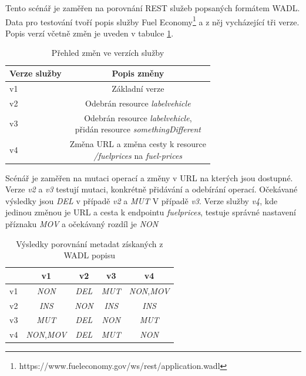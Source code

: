 \documentclass[czech,DP]{thesiskiv}
\begin{document}
Tento scénář je zaměřen na porovnání REST služeb popsaných formátem WADL. Data pro testování tvoří popis služby Fuel Economy\footnote{https://www.fueleconomy.gov/ws/rest/application.wadl} a z něj vycházející tři verze. Popis verzí včetně změn je uveden v tabulce \ref{tab:wadl-diffs}.

\begin{table}[h]
	\centering
	\begin{tabular}{|l|c|}
		\hline
		Verze služby & Popis změny \\
		\hline
		\hline
		v1 & Základní verze \\
		\hline
		v2 & Odebrán resource \textit{labelvehicle} \\
		\hline
		v3 & \makecell{Odebrán resource \textit{labelvehicle}, \\ přidán resource \textit{somethingDifferent}} \\
		\hline
		v4 & \makecell{Změna URL a změna cesty k resource \\ \textit{/fuelprices} na \textit{fuel-prices}}  \\
		\hline
	\end{tabular}
	\caption{Přehled změn ve verzích služby}
	\label{tab:wadl-diffs}
\end{table}

Scénář je zaměřen na mutaci operací a změny v URL na kterých jsou dostupné. Verze \textit{v2} a \textit{v3} testují mutaci, konkrétně přidávání a odebírání operací. Očekávané výsledky jsou \textit{DEL} v případě \textit{v2} a \textit{MUT} V případě \textit{v3}. Verze služby \textit{v4}, kde jedinou změnou je URL a cesta k endpointu \textit{fuelprices}, testuje správné nastavení příznaku \textit{MOV} a očekávaný rozdíl je \textit{NON}

\begin{table}[h]
	\centering
	\begin{tabular}{|l||c|c|c|c|}
		\hline
		& v1 & v2 & v3 & v4 \\
		\hline
		\hline
		v1 & \textit{NON} & \textit{DEL} & \textit{MUT} & \textit{NON},\textit{MOV} \\
		\hline
		v2 & \textit{INS} & \textit{NON} & \textit{INS} & \textit{INS} \\
		\hline
		v3 & \textit{MUT} & \textit{DEL} & \textit{NON} & \textit{MUT} \\
		\hline
		v4 & \textit{NON},\textit{MOV} & \textit{DEL} & \textit{MUT} & \textit{NON} \\
		\hline
	\end{tabular}
	\caption{Výsledky porovnání metadat získaných z WADL popisu}
	\label{tab:wadl-cmp-res}
\end{table} 
\end{document}
